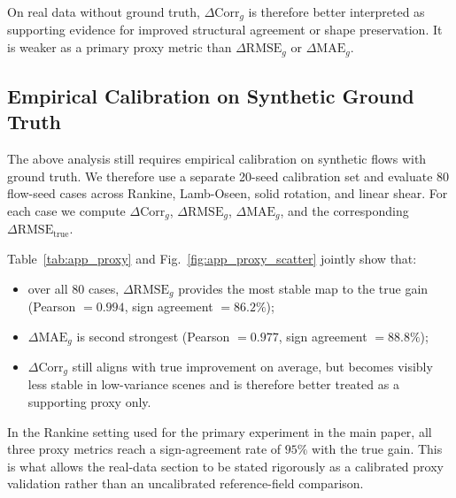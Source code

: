 \documentclass[lettersize,journal,onecolumn]{IEEEtran}
\begin{document}
On real data without ground truth,
$\Delta \mathrm{Corr}_g$ is therefore better interpreted as supporting evidence for
improved structural agreement or shape preservation.
It is weaker as a primary proxy metric than
$\Delta \mathrm{RMSE}_g$ or $\Delta \mathrm{MAE}_g$.

\subsection{Empirical Calibration on Synthetic Ground Truth}

The above analysis still requires empirical calibration on synthetic flows with
ground truth.
We therefore use a separate 20-seed calibration set and evaluate
80 flow-seed cases across Rankine, Lamb-Oseen, solid rotation, and linear shear.
For each case we compute
$\Delta \mathrm{Corr}_g$,
$\Delta \mathrm{RMSE}_g$,
$\Delta \mathrm{MAE}_g$,
and the corresponding
$\Delta \mathrm{RMSE}_{\mathrm{true}}$.

Table~\ref{tab:app_proxy} and Fig.~\ref{fig:app_proxy_scatter} jointly show that:
\begin{itemize}
  \item over all 80 cases, $\Delta \mathrm{RMSE}_g$ provides the most stable map to the true gain
  (Pearson $=0.994$, sign agreement $=86.2\%$);
  \item $\Delta \mathrm{MAE}_g$ is second strongest
  (Pearson $=0.977$, sign agreement $=88.8\%$);
  \item $\Delta \mathrm{Corr}_g$ still aligns with true improvement on average,
  but becomes visibly less stable in low-variance scenes and is therefore
  better treated as a supporting proxy only.
\end{itemize}
In the Rankine setting used for the primary experiment in the main paper,
all three proxy metrics reach a sign-agreement rate of $95\%$ with the true gain.
This is what allows the real-data section to be stated rigorously as a
calibrated proxy validation rather than an uncalibrated reference-field comparison.
\end{document}
